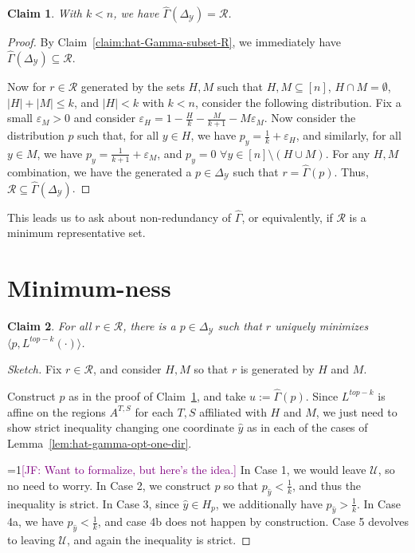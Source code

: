 \documentclass[12pt]{article}
\newcommand{\Comments}{1}
\newcommand{\mynote}[2]{\ifnum\Comments=1\textcolor{#1}{#2}\fi}
\newcommand{\jessie}[1]{\mynote{purple}{[JF: #1]}}
\newcommand{\simplex}{\Delta_\Y}
\newcommand{\R}{\mathcal{R}}
\newcommand{\U}{\mathcal{U}}
\newcommand{\Y}{\mathcal{Y}}
\newcommand{\inprod}[2]{\langle #1, #2 \rangle}%
\newtheorem{claim}{Claim}
\begin{document}
\begin{claim}\label{claim:range-hat-gamma-equals-R}
	With $k < n$, we have $\hat \Gamma(\simplex) = \R$.
\end{claim}
\begin{proof}
	By Claim~\ref{claim:hat-Gamma-subset-R}, we immediately have $\hat \Gamma(\simplex) \subseteq \R$.
	
	Now for $r \in \R$ generated by the sets $H,M$ such that $H, M \subseteq [n]$, $H \cap M = \emptyset$, $|H| + |M| \leq k$, and $|H| < k$ with $k <n$, consider the following distribution.
	Fix a small $\varepsilon_M > 0$ and consider $\varepsilon_H = 1 - \frac H k - \frac M {k+1} - M \varepsilon_M$.
	Now consider the distribution $p$ such that, for all $y \in H$, we have $p_y = \frac 1 k + \varepsilon_H$, and similarly, for all $y \in M$, we have $p_y = \frac 1 {k+1} + \varepsilon_M$, and $p_y  = 0 \,\, \forall y \in [n] \setminus (H \cup M)$.
	For any $H,M$ combination, we have the generated a $p \in \simplex$ such that $r = \hat \Gamma(p)$. 
	Thus, $\R \subseteq \hat \Gamma(\simplex)$.
\end{proof}

This leads us to ask about non-redundancy of $\hat \Gamma$, or equivalently, if $\R$ is a minimum representative set.

\section{Minimum-ness}
\begin{claim}
	For all $r \in \R$, there is a $p \in \simplex$ such that $r$ uniquely minimizes $\inprod{p}{L^{top-k}(\cdot)}$.
\end{claim}
\begin{proof}[Sketch]
	Fix $r \in \R$, and consider $H,M$ so that $r$ is generated by $H$ and $M$.
	
	Construct $p$ as in the proof of Claim~\ref{claim:range-hat-gamma-equals-R}, and take $u := \hat \Gamma(p)$.
	Since $L^{top-k}$ is affine on the regions $A^{T,S}$ for each $T,S$ affiliated with $H$ and $M$, we just need to show strict inequality changing one coordinate $\hat y$ as in each of the cases of Lemma~\ref{lem:hat-gamma-opt-one-dir}.
	
	
	
	\jessie{Want to formalize, but here's the idea.}
	In Case 1, we would leave $\U$, so no need to worry.
	In Case 2, we construct $p$ so that $p_{\hat y} < \frac 1 k$, and thus the inequality is strict.
	In Case 3, since $\hat y \in H_p$, we additionally have $p_{\hat y} > \frac 1 k$.
	In Case 4a, we have $p_{\hat y} < \frac 1 k$, and case 4b does not happen by construction.
	Case 5 devolves to leaving $\U$, and again the inequality is strict. 
\end{proof}
\end{document}
